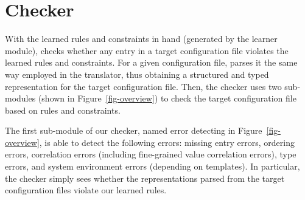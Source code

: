 
\section{Checker}
\label{sec-checker}

With the learned rules and constraints in hand (generated
by the learner module),
\app checks whether any entry in a target configuration file
violates the learned rules and constraints.
For a given configuration file, \app parses it the same
way employed in the translator, thus obtaining a structured
and typed representation for the target configuration file.
Then, the checker uses two sub-modules (shown in 
Figure~\ref{fig-overview}) to check the target
configuration file based on rules and constraints.

The first sub-module of our checker,
named error detecting in Figure~\ref{fig-overview}, 
is able to detect the following errors:
missing entry errors, ordering errors, 
correlation errors (including fine-grained value correlation errors),
type errors, and system environment errors (depending on templates).
In particular, the checker simply sees whether the representations 
parsed from the target configuration files violate our
learned rules.
